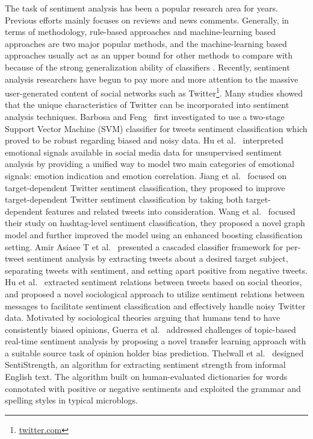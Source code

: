 \documentclass{llncs}
\begin{document}
The task of sentiment analysis has been a popular research area for years. 
Previous efforts mainly focuses on reviews and news comments. 
Generally, in terms of methodology, rule-based approaches and machine-learning based approaches are two major popular methods, and the machine-learning based approaches usually act as an upper bound for other methods to compare with because of the strong generalization ability of classifiers \cite{xsongx:b1,xsongx:b4}. 
Recently, sentiment analysis researchers have begun to pay more and more attention to the massive user-generated content of social networks such as Twitter\footnote{\url{twitter.com}}. 
Many studies showed that the unique characteristics of Twitter can be incorporated into sentiment analysis techniques.
Barbosa and Feng~\cite{Barbosa:2010RSD} first investigated to use a two-stage Support Vector Machine (SVM) classifier for tweets sentiment classification which proved to be robust regarding biased and noisy data. 
Hu et al.~\cite{Hu:2013www} interpreted emotional signals available in social media data for unsupervised sentiment analysis by providing a unified way to model two main categories of emotional signals: emotion indication and emotion correlation. 
Jiang et al.~\cite{xsongx:b6} focused on target-dependent Twitter sentiment classification, they proposed to improve target-dependent Twitter sentiment classification by taking both target-dependent features and related tweets into consideration. 
Wang et al.~\cite{Wang:2011TSA} focused their study on hashtag-level sentiment classification, they proposed a novel graph model and further improved the model using an enhanced boosting classification setting. 
Amir Asiaee T et al.~\cite{AsiaeeT:2012} presented a cascaded classifier framework for per-tweet sentiment analysis by extracting tweets about a desired target subject, separating tweets with sentiment, and  setting apart positive from negative tweets.
Hu et al.~\cite{Hu:2013ESR} extracted sentiment relations between tweets based on social theories, and proposed a novel sociological approach to utilize sentiment relations between messages to facilitate sentiment classification and effectively handle noisy Twitter data.
Motivated by sociological theories arguing that humans tend to have consistently biased opinions, Guerra et al.~\cite{CalaisGuerra:2011BOT} addressed challenges of topic-based real-time sentiment analysis by proposing a novel transfer learning approach with a suitable source task of opinion holder bias prediction.
Thelwall et al.~\cite{Thelwall:2010SSS,Thelwall:2012SSD} designed SentiStrength, an algorithm for extracting sentiment strength from informal English text. The algorithm built on human-evaluated dictionaries for words connotated with positive or negative sentiments and exploited the grammar and spelling styles in typical microblogs.
\end{document}
